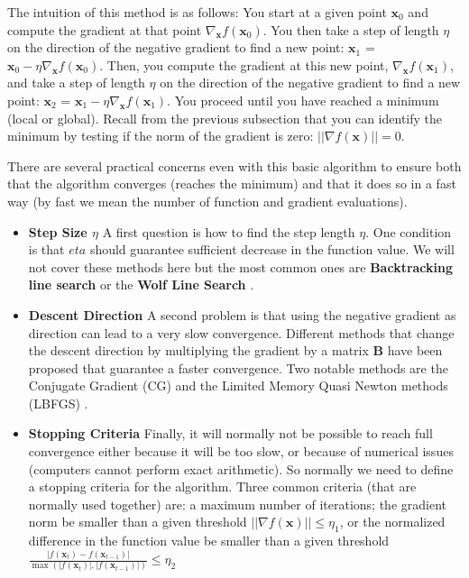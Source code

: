 The intuition of this method is as follows: You start at a given point $\textbf{x}_0$ and compute the gradient at that point $\nabla_{\textbf{x}} f(\textbf{x}_0)$. You then take a step of length $\eta$ on the direction of the negative gradient to find a new point: $\textbf{x}_1$ = $\textbf{x}_0 - \eta \nabla_{\textbf{x}}
f(\textbf{x}_{0})$. Then, you compute the gradient at this new point, $\nabla_{\textbf{x}} f(\textbf{x}_1)$, and take a step of length $\eta$ on the direction of the negative gradient to find a new point: $\textbf{x}_2$ = $\textbf{x}_1 - \eta \nabla_{\textbf{x}} f(\textbf{x}_{1})$. You proceed until you have reached a minimum (local or global). Recall from the previous subsection that you can identify the minimum by testing if the norm of the gradient is zero: $||\nabla f(\textbf{x})|| = 0$.

There are several practical concerns even with this basic algorithm to ensure both that the algorithm converges (reaches the minimum) and that it does so in a fast way (by fast we mean the number of function and gradient evaluations).

\begin{itemize}
\item \textbf{Step Size $\eta$} A first question is how to find the step length $\eta$. One condition is that $eta$ should guarantee sufficient decrease in the function value. We will not cover these methods here but the most common ones are \textbf{Backtracking line search} or the \textbf{Wolf Line Search} \citep{Nocedal1999}.
\item \textbf{Descent Direction}  A second problem is that using the negative gradient as direction can lead to a very slow convergence. Different methods that change the descent direction by multiplying the gradient by a matrix $\textbf{B}$ have been proposed that guarantee a faster convergence. Two notable methods are the Conjugate Gradient (CG) and the Limited Memory Quasi Newton methods (LBFGS) \citep{Nocedal1999}.
\item \textbf{Stopping Criteria} Finally, it will normally not be possible to reach full convergence either because it will be too slow, or because of numerical issues (computers cannot perform exact arithmetic). So normally we need to define a stopping criteria for the algorithm. Three common criteria (that are normally used together) are: a maximum number of iterations; the gradient norm be smaller than a given threshold   $||\nabla f(\textbf{x})|| \leq \eta_1$, or the normalized difference in the function value be smaller than a given threshold $\frac{|f(\textbf{x}_t) - f(\textbf{x}_{t-1})|}{\max(|f(\textbf{x}_t)|,|f(\textbf{x}_{t-1})|)} \leq \eta_2$
\end{itemize}

